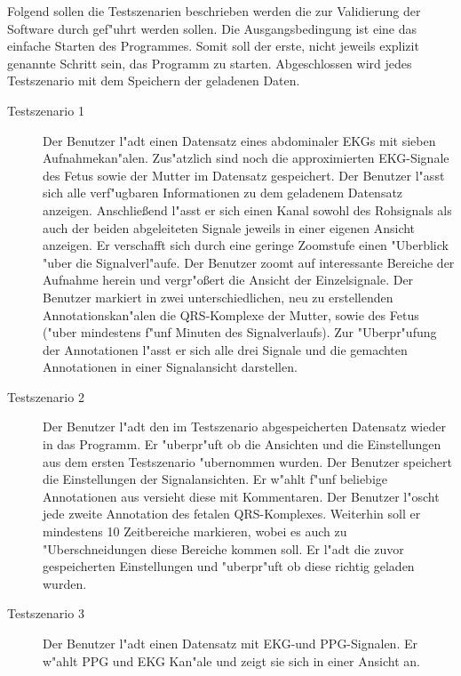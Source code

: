 Folgend sollen die Testszenarien beschrieben werden die zur Validierung der Software durch gef"uhrt werden sollen.
Die Ausgangsbedingung ist eine das einfache Starten des Programmes.
Somit soll der erste, nicht jeweils explizit genannte Schritt sein, das Programm zu starten.
Abgeschlossen wird jedes Testszenario mit dem Speichern der geladenen Daten.
\begin{description}
\item[Testszenario 1] Der Benutzer l"adt einen Datensatz eines abdominaler EKGs mit sieben Aufnahmekan"alen.
					  Zus"atzlich sind noch die approximierten EKG-Signale des Fetus sowie der Mutter im Datensatz gespeichert.
					  Der Benutzer l"asst sich alle verf"ugbaren Informationen zu dem geladenem Datensatz anzeigen.
					  Anschlie\ss end l"asst er sich einen Kanal sowohl des Rohsignals als auch der beiden abgeleiteten Signale jeweils in einer eigenen Ansicht anzeigen.
					  Er verschafft sich durch eine geringe Zoomstufe einen "Uberblick "uber die Signalverl"aufe.
					  Der Benutzer zoomt auf interessante Bereiche der Aufnahme herein und vergr"o\ss ert die Ansicht der Einzelsignale.
					  Der Benutzer markiert in zwei unterschiedlichen, neu zu erstellenden Annotationskan"alen die QRS-Komplexe der Mutter, sowie des Fetus ("uber mindestens f"unf Minuten des Signalverlaufs).
					  Zur "Uberpr"ufung der Annotationen l"asst er sich alle drei Signale und die gemachten Annotationen in einer Signalansicht darstellen.
\item[Testszenario 2] Der Benutzer l"adt den im Testszenario abgespeicherten Datensatz wieder in das Programm.
					  Er "uberpr"uft ob die Ansichten und die Einstellungen aus dem ersten Testszenario "ubernommen wurden.
					  Der Benutzer speichert die Einstellungen der Signalansichten.
					  Er w"ahlt f"unf beliebige Annotationen aus versieht diese mit Kommentaren.
					  Der Benutzer l"oscht jede zweite Annotation des fetalen QRS-Komplexes.
					  Weiterhin soll er mindestens 10 Zeitbereiche markieren, wobei es auch zu "Uberschneidungen diese Bereiche kommen soll.
					  Er l"adt die zuvor gespeicherten Einstellungen und "uberpr"uft ob diese richtig geladen wurden.
\item[Testszenario 3] Der Benutzer l"adt einen Datensatz mit EKG-und PPG-Signalen.
					  Er w"ahlt PPG und EKG Kan"ale und zeigt sie sich in einer Ansicht an.
					  
\end{description}

